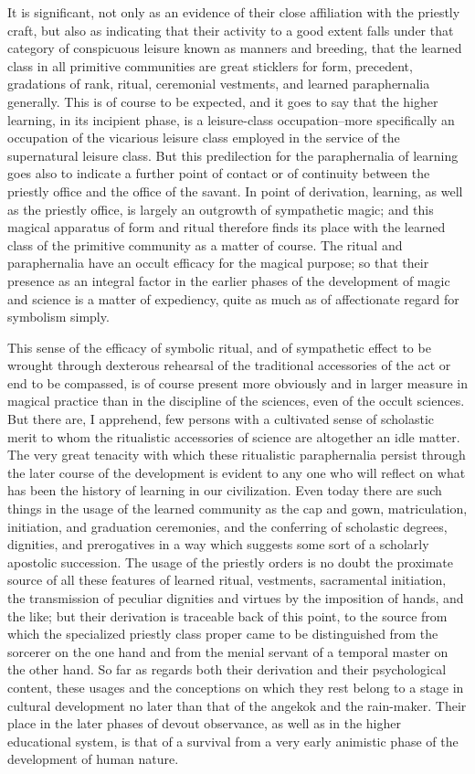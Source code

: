 \documentclass[12pt]{report}
\begin{document}
It is significant, not only as an evidence of their close affiliation
with the priestly craft, but also as indicating that their activity to
a good extent falls under that category of conspicuous leisure known
as manners and breeding, that the learned class in all primitive
communities are great sticklers for form, precedent, gradations of rank,
ritual, ceremonial vestments, and learned paraphernalia generally.
This is of course to be expected, and it goes to say that the higher
learning, in its incipient phase, is a leisure-class occupation--more
specifically an occupation of the vicarious leisure class employed in
the service of the supernatural leisure class. But this predilection for
the paraphernalia of learning goes also to indicate a further point of
contact or of continuity between the priestly office and the office of
the savant. In point of derivation, learning, as well as the priestly
office, is largely an outgrowth of sympathetic magic; and this magical
apparatus of form and ritual therefore finds its place with the learned
class of the primitive community as a matter of course. The ritual and
paraphernalia have an occult efficacy for the magical purpose; so
that their presence as an integral factor in the earlier phases of the
development of magic and science is a matter of expediency, quite as
much as of affectionate regard for symbolism simply.

This sense of the efficacy of symbolic ritual, and of sympathetic effect
to be wrought through dexterous rehearsal of the traditional accessories
of the act or end to be compassed, is of course present more obviously
and in larger measure in magical practice than in the discipline of the
sciences, even of the occult sciences. But there are, I apprehend,
few persons with a cultivated sense of scholastic merit to whom the
ritualistic accessories of science are altogether an idle matter. The
very great tenacity with which these ritualistic paraphernalia persist
through the later course of the development is evident to any one
who will reflect on what has been the history of learning in our
civilization. Even today there are such things in the usage of the
learned community as the cap and gown, matriculation, initiation,
and graduation ceremonies, and the conferring of scholastic degrees,
dignities, and prerogatives in a way which suggests some sort of a
scholarly apostolic succession. The usage of the priestly orders is
no doubt the proximate source of all these features of learned ritual,
vestments, sacramental initiation, the transmission of peculiar
dignities and virtues by the imposition of hands, and the like; but
their derivation is traceable back of this point, to the source from
which the specialized priestly class proper came to be distinguished
from the sorcerer on the one hand and from the menial servant of
a temporal master on the other hand. So far as regards both their
derivation and their psychological content, these usages and the
conceptions on which they rest belong to a stage in cultural development
no later than that of the angekok and the rain-maker. Their place in the
later phases of devout observance, as well as in the higher educational
system, is that of a survival from a very early animistic phase of the
development of human nature.
\end{document}
